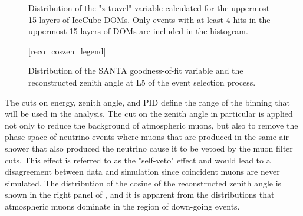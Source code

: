 \begin{figure}
    \centering
    
    \caption{Distribution of the "z-travel" variable calculated for the uppermost 15 layers of IceCube DOMs. Only events with at least 4 hits in the uppermost 15 layers of DOMs are included in the histogram.}
    \label{fig:z_travel_distribution}
\end{figure}

%     


\begin{figure}
    \centering
    \ref{reco_coszen_legend}\par
    
    
    \caption{Distribution of the SANTA goodness-of-fit variable and the reconstructed zenith angle at L5 of the event selection process.}
    \label{fig:final_cut_vars_l5}
\end{figure}

The cuts on energy, zenith angle, and PID define the range of the binning that will be used in the analysis.
The cut on the zenith angle in particular is applied not only to reduce the background of atmospheric muons, but also to remove the phase space of neutrino events where muons that are produced in the same air shower that also produced the neutrino cause it to be vetoed by the muon filter cuts.
This effect is referred to as the "self-veto" effect and would lead to a disagreement between data and simulation since coincident muons are never simulated.
The distribution of the cosine of the reconstructed zenith angle is shown in the right panel of , and it is apparent from the distributions that atmospheric muons dominate in the region of down-going events.

